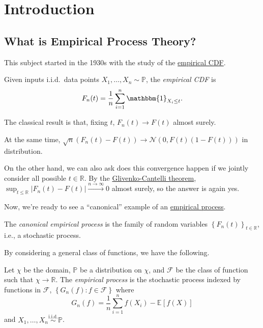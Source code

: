 \chapter{Introduction}
\section{What is Empirical Process Theory?}
This subject started in the 1930s with the study of the \hyperref[def:empirical-CDF]{empirical CDF}.

\begin{definition}\label{def:empirical-CDF}
	Given inputs i.i.d.\ data points \(X_1, \dots , X_n \sim \mathbb{P} \), the \emph{empirical CDF} is
	\[
		F_n(t) = \frac{1}{n} \sum_{i=1}^{n} \mathbbm{1}_{X_i \leq t} .
	\]
\end{definition}

The classical result is that, fixing \(t\), \(F_n(t) \to F(t)\) almost surely.

\begin{note}
	At the same time, \(\sqrt{n} (F_n(t) - F(t)) \to \mathcal{N} (0, F(t)(1 - F(t)))\) in distribution.
\end{note}

On the other hand, we can also ask does this convergence happen if we jointly consider all possible \(t\in \mathbb{R} \). By the \href{https://en.wikipedia.org/wiki/Glivenko%E2%80%93Cantelli_theorem}{Glivenko-Cantelli theorem}, \(\sup _{t \leq\mathbb{R} } \vert F_n(t) - F(t) \vert \overset{n \to \infty }{\to } 0\) almost surely, so the answer is again yes.

Now, we're ready to see a ``canonical'' example of an \hyperref[def:empirical-process]{empirical process}.

\begin{eg}
	The \emph{canonical empirical process} is the family of random variables \(\left\{ F_n(t) \right\}_{t\in \mathbb{R} } \), i.e., a stochastic process.
\end{eg}

By considering a general class of functions, we have the following.

\begin{definition}\label{def:empirical-process}
	Let \(\chi \) be the domain, \(\mathbb{P} \) be a distribution on \(\chi \), and \(\mathscr{F} \) be the class of function such that \(\chi \to \mathbb{R} \). The \emph{empirical process} is the stochastic process indexed by functions in \(\mathscr{F} \), \(\left\{ G_n(f) \colon f\in \mathscr{F}  \right\} \) where
	\[
		G_n(f) = \frac{1}{n} \sum_{i=1}^{n} f(X_i) - \mathbb{E}_{}\left[f(X) \right]
	\]
	and \(X_1, \dots , X_n \overset{\text{i.i.d.} }{\sim } \mathbb{P} \).
\end{definition}

